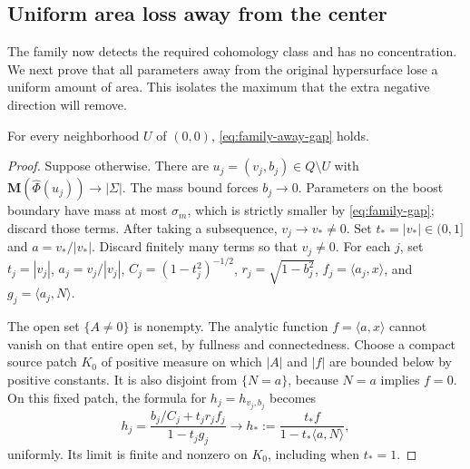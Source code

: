 \subsection{Uniform area loss away from the center}

The family now detects the required cohomology class and has no
concentration. We next prove that all parameters away from the original
hypersurface lose a uniform amount of area. This isolates the maximum
that the extra negative direction will remove.

\begin{lemma}
\label{lem:family-strict-loss}
For every neighborhood $U$ of $(0,0)$,
\eqref{eq:family-away-gap} holds.
\end{lemma}

\begin{proof}
Suppose otherwise.  There are $u_j=(v_j,b_j)\in Q\setminus U$ with
$\mathbf M(\widehat\Phi(u_j))\to|\Sigma|$.
The mass bound forces $b_j\to0$.
Parameters on the boost boundary have mass at most $\sigma_m$, which
is strictly smaller by \eqref{eq:family-gap}; discard those terms.
After taking a subsequence, $v_j\to v_*\ne0$.
Set $t_*=|v_*|\in(0,1]$ and $a=v_*/|v_*|$.
Discard finitely many terms so that $v_j\ne0$.
For each $j$, set $t_j=|v_j|$, $a_j=v_j/|v_j|$,
$C_j=(1-t_j^2)^{-1/2}$, $r_j=\sqrt{1-b_j^2}$,
$f_j=\langle a_j,x\rangle$, and $g_j=\langle a_j,N\rangle$.

The open set $\{A\ne0\}$ is nonempty.  The analytic function
$f=\langle a,x\rangle$ cannot vanish on that entire open set, by
fullness and connectedness.  Choose a compact source patch $K_0$ of
positive measure on which $|A|$ and $|f|$ are bounded below by
positive constants.  It is also disjoint from $\{N=a\}$, because
$N=a$ implies $f=0$.
On this fixed patch, the formula for $h_j=h_{v_j,b_j}$ becomes
\[
 h_j=\frac{b_j/C_j+t_jr_jf_j}{1-t_jg_j}
 \longrightarrow
 h_*:=\frac{t_*f}{1-t_*\langle a,N\rangle},
\]
uniformly.  Its limit is finite and nonzero on $K_0$, including when
$t_*=1$.


\end{proof}
